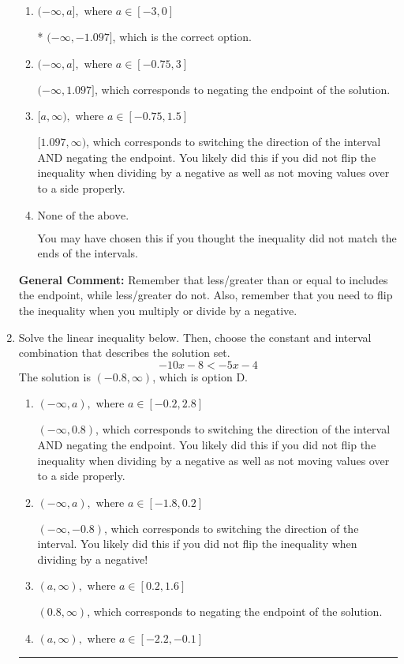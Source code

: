 \documentclass{extbook}[14pt]
\newcommand{\litem}[1]{\item #1

\rule{\textwidth}{0.4pt}}
\begin{document}
\begin{enumerate}
{\begin{enumerate}[label=\Alph*.]
 $[-1.097, \infty)$, which corresponds to switching the direction of the interval. You likely did this if you did not flip the inequality when dividing by a negative!
\item \( (-\infty, a], \text{ where } a \in [-3, 0] \)

* $(-\infty, -1.097]$, which is the correct option.
\item \( (-\infty, a], \text{ where } a \in [-0.75, 3] \)

 $(-\infty, 1.097]$, which corresponds to negating the endpoint of the solution.
\item \( [a, \infty), \text{ where } a \in [-0.75, 1.5] \)

 $[1.097, \infty)$, which corresponds to switching the direction of the interval AND negating the endpoint. You likely did this if you did not flip the inequality when dividing by a negative as well as not moving values over to a side properly.
\item \( \text{None of the above}. \)

You may have chosen this if you thought the inequality did not match the ends of the intervals.
\end{enumerate}

\textbf{General Comment:} Remember that less/greater than or equal to includes the endpoint, while less/greater do not. Also, remember that you need to flip the inequality when you multiply or divide by a negative.
}
\litem{
Solve the linear inequality below. Then, choose the constant and interval combination that describes the solution set.
\[ -10x -8 < -5x -4 \]The solution is \( (-0.8, \infty) \), which is option D.\begin{enumerate}[label=\Alph*.]
\item \( (-\infty, a), \text{ where } a \in [-0.2, 2.8] \)

 $(-\infty, 0.8)$, which corresponds to switching the direction of the interval AND negating the endpoint. You likely did this if you did not flip the inequality when dividing by a negative as well as not moving values over to a side properly.
\item \( (-\infty, a), \text{ where } a \in [-1.8, 0.2] \)

 $(-\infty, -0.8)$, which corresponds to switching the direction of the interval. You likely did this if you did not flip the inequality when dividing by a negative!
\item \( (a, \infty), \text{ where } a \in [0.2, 1.6] \)

 $(0.8, \infty)$, which corresponds to negating the endpoint of the solution.
\item \( (a, \infty), \text{ where } a \in [-2.2, -0.1] \)


\end{enumerate}}
\end{enumerate}
\end{document}
